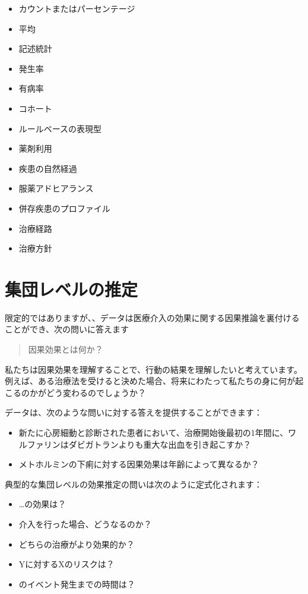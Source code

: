 \documentclass[
  11pt]{book}
\providecommand{\tightlist}{%
  \setlength{\itemsep}{0pt}\setlength{\parskip}{0pt}}
\theoremstyle{definition}
\theoremstyle{definition}
\theoremstyle{definition}
\theoremstyle{definition}
\theoremstyle{remark}
\begin{document}
\begin{itemize}
\tightlist
\item
  カウントまたはパーセンテージ
\item
  平均
\item
  記述統計
\item
  発生率
\item
  有病率
\item
  コホート
\item
  ルールベースの表現型
\item
  薬剤利用
\item
  疾患の自然経過
\item
  服薬アドヒアランス
\item
  併存疾患のプロファイル
\item
  治療経路
\item
  治療方針
\end{itemize}

\section{集団レベルの推定}\label{ux96c6ux56e3ux30ecux30d9ux30ebux306eux63a8ux5b9a}


限定的ではありますが、、データは医療介入の効果に関する因果推論を裏付けることができ、次の問いに答えます

\begin{quote}
因果効果とは何か？
\end{quote}

私たちは因果効果を理解することで、行動の結果を理解したいと考えています。例えば、ある治療法を受けると決めた場合、将来にわたって私たちの身に何が起こるのかがどう変わるのでしょうか？

データは、次のような問いに対する答えを提供することができます：

\begin{itemize}
\tightlist
\item
  新たに心房細動と診断された患者において、治療開始後最初の1年間に、ワルファリンはダビガトランよりも重大な出血を引き起こすか？
\item
  メトホルミンの下痢に対する因果効果は年齢によって異なるか？
\end{itemize}

典型的な集団レベルの効果推定の問いは次のように定式化されます：

\begin{itemize}
\tightlist
\item
  \ldots の効果は？
\item
  介入を行った場合、どうなるのか？
\item
  どちらの治療がより効果的か？
\item
  Yに対するXのリスクは？
\item
  のイベント発生までの時間は？
\end{itemize}
\end{document}
